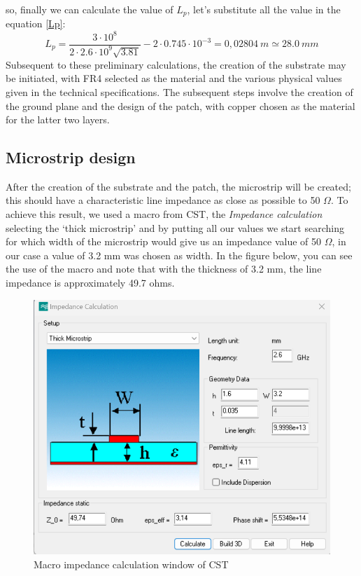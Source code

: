 \documentclass[]{article}
\begin{document}
so, finally we can calculate the value of $L_p$, let's substitute all the value in the equation \eqref{Lp}: 
\[L_p = \frac{3 \cdot 10^8}{2\cdot 2.6 \cdot 10^9 \sqrt{3.81}} - 2\cdot 0.745 \cdot 10^{-3} = 0,02804 \ m \simeq 28.0 \ mm
 \]
  Subsequent to these preliminary calculations, the creation of the substrate may be initiated, with FR4 selected as the material and the various physical values given in the technical specifications. The subsequent steps involve the creation of the ground plane and the design of the patch, with copper chosen as the material for the latter two layers.
 \newpage
 \subsection{Microstrip design}
 After the creation of the substrate and the patch, the microstrip will be created; this should have a characteristic line impedance as close as possible to 50 $\Omega$.
 To achieve this result, we used a macro from CST, the \textit{Impedance calculation} selecting the ‘thick microstrip’ and by putting all our values we start searching for which width of the microstrip would give us an impedance value of 50 $\Omega$, in our case a value of 3.2 mm was chosen as width.
 In the figure below, you can see the use of the macro and note that with the thickness of 3.2 mm, the line impedance is approximately 49.7 ohms.
\begin{figure}[h]
	\centering
	\includegraphics[width=0.30\linewidth]{img/img4}
	\caption{Macro impedance calculation window of CST}
	\label{fig:img4}
\end{figure}
\end{document}
